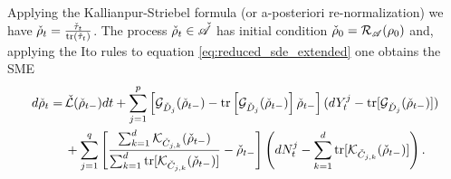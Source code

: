 \documentclass[aihp,12pt]{imsart}
\begin{document}
Applying the Kallianpur-Striebel formula \cite[Theorem 6.2]{bouten2007introduction} (or a-posteriori re-normalization) we have $\check{\rho}_t = \frac{\check{\tau}_t}{{\rm tr}(\check{\tau}_t)}$. The process $\check{\rho}_t\in\check{\mathscr{A}}$ has initial condition $\check{\rho}_0 = \mathcal{R}_{\mathscr{A}}(\rho_0)$ and, applying the Ito rules to equation \eqref{eq:reduced_sde_extended} one obtains the SME 
\begin{equation}
\begin{split}
    d\check{\rho}_t =\,& \check{\mathcal{L}}(\check{\rho}_{t-}) dt + \sum_{j=1}^{p}\left[\mathcal{G}_{\check{D}_j}(\check{\rho}_{t-}) - {\rm tr}\left[\mathcal{G}_{\check{D}_j}(\check{\rho}_{t-})\right]\check{\rho}_{t-}\right](dY_t^j - {\rm tr}[\mathcal{G}_{\check{D}_j}(\check{\rho}_{t-})]) \\
    &+ \sum_{j=1}^{q}  \left[ \frac{\sum_{k=1}^{d}\mathcal{K}_{\check{C}_{j,k}}(\check{\rho}_{t-})}{\sum_{k=1}^{d}{\rm tr}[\mathcal{K}_{\check{C}_{j,k}}(\check{\rho}_{t-})]} - \check{\rho}_{t-} \right]\left(dN_t^{j} - \sum_{k=1}^{d}{\rm tr}[\mathcal{K}_{\check{C}_{j,k}}(\check{\rho}_{t-})]\right).
\end{split}
\label{eq:reduced_SME}
\end{equation}
\end{document}
